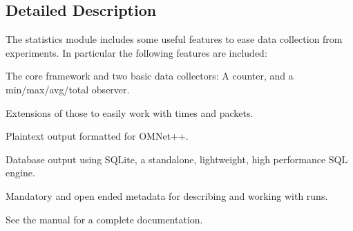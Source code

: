 \subsection{Detailed Description}
The statistics module includes some useful features to ease data collection from experiments. In particular the following features are included\+: 
\begin{DoxyItemize}
\item The core framework and two basic data collectors\+: A counter, and a min/max/avg/total observer. 
\item Extensions of those to easily work with times and packets. 
\item Plaintext output formatted for O\+M\+Net++. 
\item Database output using S\+Q\+Lite, a standalone, lightweight, high performance S\+QL engine. 
\item Mandatory and open ended metadata for describing and working with runs. 
\end{DoxyItemize}

See the manual for a complete documentation. 